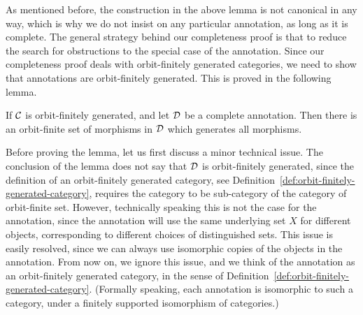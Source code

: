 As mentioned before, the construction in the above lemma is not canonical in any way, which is why we do not insist on any particular annotation, as long as it is complete. The general strategy behind our completeness proof is that to reduce the search for obstructions to the special case of the annotation.  Since our completeness proof deals with orbit-finitely generated categories, we need to show that annotations are orbit-finitely generated. This is proved in the following lemma.



\begin{lemma}\label{lem:annotation-orbit-finitely-generated}
    If ${\mathcal C}$ is orbit-finitely generated, and let ${\mathcal D}$ be a complete annotation. Then there is an orbit-finite set of morphisms in ${\mathcal D}$ which generates all morphisms.
\end{lemma}

Before proving the lemma, let us first discuss a minor technical issue. 
The conclusion of the lemma does not say that ${\mathcal D}$ is orbit-finitely generated, since the definition of an orbit-finitely generated category, see Definition~\ref{def:orbit-finitely-generated-category},  requires the category to be sub-category of the category of orbit-finite set. However, technically speaking this is not the case for the annotation, since the annotation will use the same underlying set $X$ for different objects, corresponding to different choices of distinguished sets.  This issue is easily resolved, since we can always use isomorphic copies of the objects in the annotation. From now on, we ignore this issue, and we think of the annotation as an orbit-finitely generated category, in the sense of Definition~\ref{def:orbit-finitely-generated-category}. (Formally speaking, each annotation is isomorphic to such a category, under a finitely supported isomorphism of categories.)


